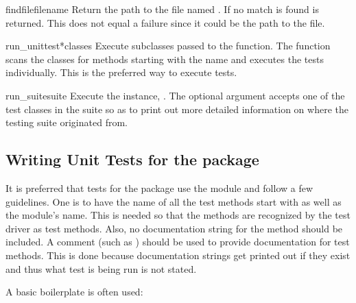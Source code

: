 \begin{funcdesc}{findfile}{filename}
Return the path to the file named .
If no match is found  is returned.
This does not equal a failure since it could be the path to the file.
\end{funcdesc}

\begin{funcdesc}{run_unittest}{*classes}
Execute  subclasses passed to the function.
The function scans the classes for methods starting with the name
 and executes the tests individually.
This is the preferred way to execute tests.
\end{funcdesc}

\begin{funcdesc}{run_suite}{suite}
Execute the  instance, .
The optional argument  accepts one of the test classes in the
suite so as to print out more detailed information on where the testing suite
originated from.
\end{funcdesc}



\subsection{Writing Unit Tests for the  package%
            \label{writing-tests}}

It is preferred that tests for the  package use the
 module and follow a few guidelines.
One is to have the name of all the test methods start with  as
well as the module's name.
This is needed so that the methods are recognized by the test driver as
test methods.
Also, no documentation string for the method should be included.
A comment (such as
) should be used to provide
documentation for test methods.
This is done because documentation strings get printed out if they exist and
thus what test is being run is not stated.

A basic boilerplate is often used:

